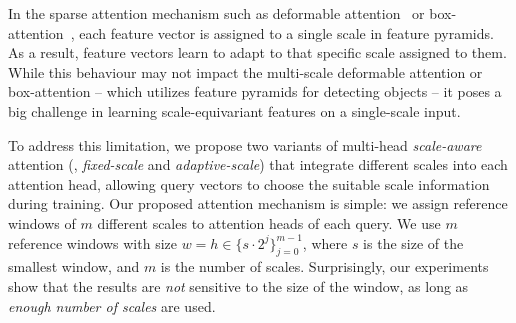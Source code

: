  In the sparse attention mechanism such as deformable attention~\cite{zhu2021deformable} or box-attention~\cite{nguyen2022boxer}, each feature vector is assigned to a single scale in feature pyramids. As a result, feature vectors learn to adapt to that specific scale assigned to them. While this behaviour may not impact the multi-scale deformable attention or box-attention -- which utilizes feature pyramids for detecting objects -- it poses a big challenge in learning scale-equivariant features on a single-scale input.

To address this limitation, we propose two variants of multi-head \emph{scale-aware} attention (\ie, \emph{fixed-scale} and \emph{adaptive-scale}) that integrate different scales into each attention head, allowing query vectors to choose the suitable scale information during training. Our proposed attention mechanism is simple: we assign reference windows of $m$ different scales to attention heads of each query. We use $m$ reference windows with size $w {=} h \in \{s \cdot 2^j\}_{j=0}^{m-1}$, where $s$ is the size of the smallest window, and $m$ is the number of scales. Surprisingly, our experiments show that the results are \emph{not} sensitive to the size of the window, as long as \emph{enough number of scales} are used.
%

